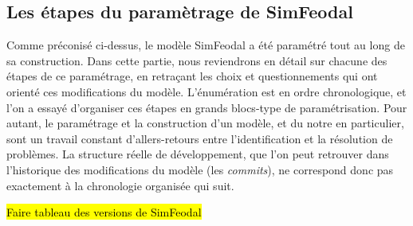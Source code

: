 \subsection{Les étapes du paramètrage de SimFeodal}

Comme préconisé ci-dessus, le modèle SimFeodal a été paramétré tout au long de sa construction.
Dans cette partie, nous reviendrons en détail sur chacune des étapes de ce paramétrage, en retraçant les choix et questionnements qui ont orienté ces modifications du modèle.
L'énumération est en ordre chronologique, et l'on a essayé d'organiser ces étapes en grands blocs-type de paramétrisation.
Pour autant, le paramétrage et la construction d'un modèle, et du notre en particulier, sont un travail constant d'allers-retours entre l'identification et la résolution de problèmes.
La structure réelle de développement, que l'on peut retrouver dans l'historique des modifications du modèle (les \og \textit{commits}\fg{}), ne correspond donc pas exactement à la chronologie organisée qui suit.

\begin{center}
	\hl{Faire tableau des versions de SimFeodal}
\end{center}

